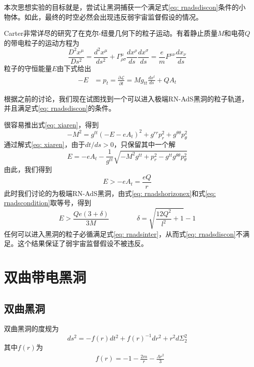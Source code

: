 本次思想实验的目标就是，尝试让黑洞捕获一个满足式\eqref{eq: rnadsdiscon}条件的小物体。如此，最终的时空必然会出现违反弱宇宙监督假设的情况\citep{wald1974gedanken}。

Carter非常详尽的研究了在克尔-纽曼几何下的粒子运动\cite{carter1968global}。有着静止质量$M$和电荷$Q$的带电粒子的运动方程为
\begin{equation}
    \frac{D^2x^\mu}{D s^2}=\frac{d^2x^\mu}{ds^2}+\Gamma^{\mu}_{\rho\sigma }\frac{dx^\rho}{ds}\frac{dx^\sigma}{ds}=\frac{e}{m}F^{\mu\nu }\frac{dx_\nu}{ds}
\end{equation}
粒子的守恒能量$E$由下式给出
\begin{align}
    -E&=p_t=\frac{\partial \mathcal{L}}{\partial \dot{t}}=Mg_{tt}\frac{dx^t}{ds}+QA_t 
\end{align}

根据之前的讨论，我们现在试图找到一个可以进入极端RN-AdS黑洞的粒子轨道，并且满足式\eqref{eq: rnadsdiscon}的条件。

很容易推出式\eqref{eq: xiaren}，得到
\begin{equation}\label{eq: xiaren}
    -M^2=g^{tt}\left(-E-eA_t\right)^2+g^{rr}p_r^2+g^{\theta \theta}p_\theta ^2
\end{equation}
通过解式\eqref{eq: xiaren}，由于$dt/ds>0$，只保留其中一个解
\begin{equation}\label{eq: rnadsguidao}
    E=-eA_t -\frac{1}{g^{tt}}\sqrt{-M^2g^{tt}+p_r^2-g^{tt}g^{\theta \theta}p_{\theta}^2}
\end{equation}
由此，我们得到
\begin{equation}
    E>-eA_t=\frac{eQ}{r}
\end{equation}
此时我们讨论的为极端RN-AdS黑洞，由式\eqref{eq: rnadshorizonex}和式\eqref{eq: rnadscondition}取等号，得到
\begin{equation}\label{eq: rnadsinter}
    E> \frac{Qe\left(3+\delta\right)}{3M} \qquad\qquad  \delta= \sqrt{\frac{12 Q^2}{l^2}+1}-1
\end{equation}
任何可以进入黑洞的粒子必循满足式\eqref{eq: rnadsinter}，从而式\eqref{eq: rnadsdiscon}不满足。这个结果保证了弱宇宙监督假设不被违反。

\section{双曲带电黑洞}
\subsection{双曲黑洞}
双曲黑洞的度规为
\begin{equation}
    ds^2=-f\left(r\right)dt^2+f\left(r\right)^{-1}dr^2+r^2d\Sigma_{2}^2
\end{equation}
其中$f\left(r\right)$为
\begin{align}
    &f\left(r\right)=-1-\frac{2m}{r}-\frac{\Lambda r^2 }{3}
\end{align}

